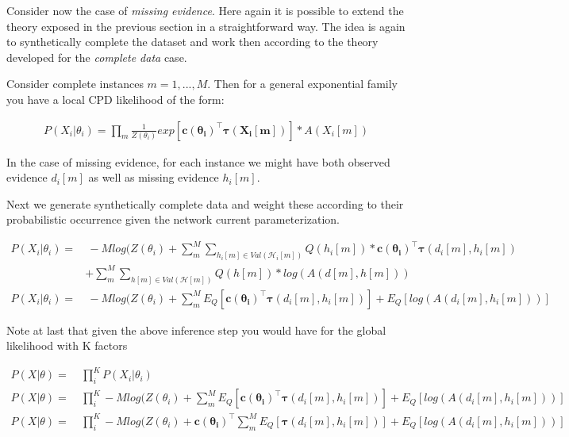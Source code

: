 \documentclass[11pt]{article}
\begin{document}
\begin{article}
Consider now the case of \emph{missing evidence}. Here again it is
possible to extend the theory exposed in the previous section in a
straightforward way. The idea is again to synthetically complete
the dataset and work then according to the theory developed for
the \emph{complete data} case.

Consider complete instances \(m = 1, ..., M\). Then for a general
exponential family you have a local CPD likelihood of the form:

\begin{align} \label{eq:exponential-family-likelihood}
P(X_i|\theta_i) = \prod_m \frac{1}{Z(\theta_i)} exp[\mathbf{c(\theta_i)}^\intercal \mathbf{\tau(X_i[m])}] * A(X_i[m]) 
\end{align}

In the case of missing evidence, for each instance we might have
both observed evidence \(d_i[m]\) as well as missing evidence \(h_i[m]\).

Next we generate synthetically complete data and weight these
according to their probabilistic occurrence given the network
current parameterization.

\begin{align} \label{eq:complete-exponential-family-likelihood}
P(X_i|\theta_i) =& \ - Mlog(Z(\theta_i) + \sum_m^M \sum_{h_i[m] \in Val(\mathscr{H}_i[m])} Q(h_i[m]) * \mathbf{c(\theta_i)}^\intercal \mathbf{\tau}(d_i[m], h_i[m])\\
            & + \sum_m^M \sum_{h[m] \in Val(\mathscr{H}[m])} Q(h[m]) * log(A(d[m], h[m]))  \nonumber \\
P(X_i|\theta_i) =& \ - Mlog(Z(\theta_i) + \sum_m^M E_Q[\mathbf{c(\theta_i)}^\intercal \mathbf{\tau}(d_i[m], h_i[m])] + E_Q[log(A(d_i[m], h_i[m]))]
\end{align}

Note at last that given the above inference step you would have
for the global likelihood with K factors

\begin{align} \label{eq:global-likelihood}
P(X|\theta) =& \ \prod_i^K P(X_i|\theta_i) \nonumber \\
P(X|\theta) =& \ \prod_i^K - Mlog(Z(\theta_i) + \sum_m^M E_Q[\mathbf{c(\theta_i)}^\intercal \mathbf{\tau}(d_i[m], h_i[m])] + E_Q[log(A(d_i[m], h_i[m]))] \\
P(X|\theta) =& \ \prod_i^K - Mlog(Z(\theta_i) + \mathbf{c(\theta_i)}^\intercal \sum_m^M E_Q[\mathbf{\tau}(d_i[m], h_i[m])] + E_Q[log(A(d_i[m], h_i[m]))] \nonumber  
\end{align}


\end{article}
\end{document}
